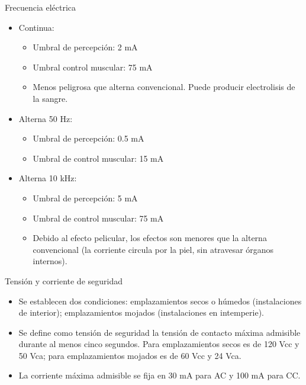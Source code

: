\documentclass[xcolor={usenames,svgnames,dvipsnames}]{beamer}
\begin{document}
\begin{frame}[label={sec:orgeb7520e}]{Frecuencia eléctrica}
\begin{itemize}
\item Continua:

\begin{itemize}
\item Umbral de percepción: 2 mA

\item Umbral control muscular: 75 mA

\item Menos peligrosa que alterna convencional. Puede producir
electrolisis de la sangre.
\end{itemize}

\item Alterna 50 Hz:

\begin{itemize}
\item Umbral de percepción: 0.5 mA

\item Umbral de control muscular: 15 mA
\end{itemize}

\item Alterna 10 kHz:

\begin{itemize}
\item Umbral de percepción: 5 mA

\item Umbral de control muscular: 75 mA

\item Debido al efecto pelicular, los efectos son menores que la alterna
convencional (la corriente circula por la piel, sin atravesar
órganos internos).
\end{itemize}
\end{itemize}
\end{frame}

\begin{frame}[label={sec:org387bcc1}]{Tensión y corriente de seguridad}
\begin{itemize}
\item Se establecen dos condiciones: \alert{emplazamientos secos o húmedos}
(instalaciones de interior); \alert{emplazamientos mojados} (instalaciones
en intemperie).

\item Se define como tensión de seguridad la tensión de contacto máxima
admisible durante al menos cinco segundos. Para emplazamientos secos
es de 120 Vcc y 50 Vca; para \alert{emplazamientos mojados es de 60 Vcc y
24 Vca}.

\item \alert{La corriente máxima admisible se fija en 30 mA para AC y 100 mA para
CC}.
\end{itemize}
\end{frame}
\end{document}
